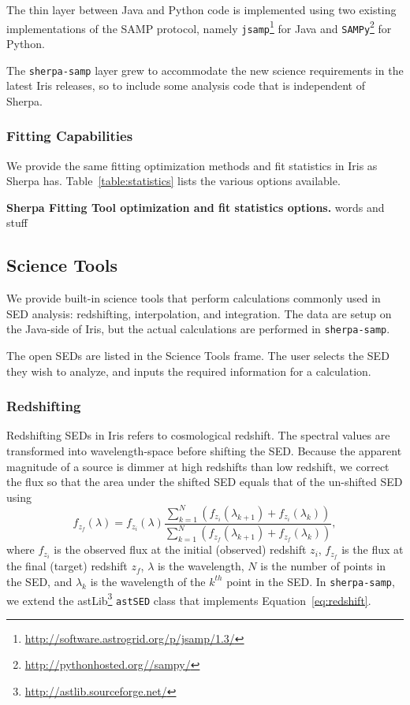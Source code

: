 \documentclass[preprint,authoryear,5p]{elsarticle}
\begin{document}
\begin{sloppypar}
The thin layer between Java and Python code is implemented using two existing
implementations of the SAMP protocol, namely
\verb|jsamp|\footnote{\url{http://software.astrogrid.org/p/jsamp/1.3/}} for Java and
\verb|SAMPy|\footnote{\url{http://pythonhosted.org//sampy/}} for Python.
\end{sloppypar}

The \verb|sherpa-samp| layer grew to accommodate the new science requirements in
the latest Iris releases, so to include some analysis code that is
independent of Sherpa.

\subsubsection{Fitting Capabilities}
\label{sherpa-fitting}

We provide the same fitting optimization methods and fit statistics in Iris as Sherpa has.
Table~\ref{table:statistics} lists the various options available.

\begin{table}
\caption{\textbf{Sherpa Fitting Tool optimization and fit statistics options.} 
words and stuff}
\label{table:statistics}

\end{table}

\subsection{Science Tools} We provide built-in science tools that perform
calculations commonly used in SED analysis: redshifting, interpolation, and
integration. The data are setup on the Java-side of Iris, but the actual
calculations are performed in \verb|sherpa-samp|.

The open SEDs are listed in the Science Tools frame. The user selects the SED
they wish to analyze, and inputs the required information for a calculation.

\subsubsection{Redshifting} Redshifting SEDs in Iris refers to cosmological
redshift. The spectral values are transformed into wavelength-space before 
shifting the SED.
Because the apparent magnitude of a source is dimmer at high redshifts
than low redshift, we correct the flux so that the area under the shifted SED
equals that of the un-shifted SED using
\begin{equation} \label{eq:redshift} f_{z_{f}}(\lambda) = f_{z_{i}}(\lambda)
\frac{\sum_{k=1}^N
(f_{z_{i}}(\lambda_{k+1})+f_{z_{i}}(\lambda_{k}))}{\sum_{k=1}^N
(f_{z_{f}}(\lambda_{k+1})+f_{z_{f}}(\lambda_{k}))}, \end{equation}
where $f_{z_i}$ is the observed flux at the initial (observed) redshift $z_i$,
$f_{z_f}$ is the flux at the final (target) redshift $z_f$, ${\lambda}$ is the
wavelength, $N$ is the number of points in the SED, and $\lambda_{k}$ is the wavelength
of the $k^{th}$ point in the SED. In \verb|sherpa-samp|, we extend the
astLib\footnote{\url{http://astlib.sourceforge.net/}} \texttt{astSED} class that
implements Equation~\ref{eq:redshift}.
\end{document}
